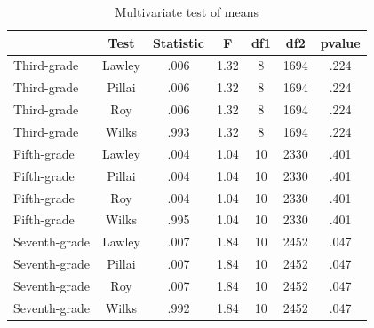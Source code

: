 \documentclass[
	article,			%
	12pt,				%
	oneside,			%
	a4paper,			%
	]{article}
\begin{document}
\begin{table}[htbp]
  \centering
\fontsize{9}{11}\selectfont
 \begin{threeparttable}
  \caption{Multivariate test of means}
\begin{tabular}{lcccccc}
\hline
\hline
     \multicolumn{1}{p{6em}}{}      &      \multicolumn{1}{p{6em}}{Test} &  \multicolumn{1}{p{6em}}{Statistic} &          \multicolumn{1}{p{6em}}{F} &     \multicolumn{1}{p{6em}}{df1} &       \multicolumn{1}{p{6em}}{df2} &   \multicolumn{1}{p{6em}}{pvalue} \\
\hline
Third-grade &     Lawley &       .006 &       1.32 &          8 &       1694 &       .224 \\

Third-grade &     Pillai &       .006 &       1.32 &          8 &       1694 &       .224 \\

Third-grade &        Roy &       .006 &       1.32 &          8 &       1694 &       .224 \\

Third-grade &      Wilks &       .993 &       1.32 &          8 &       1694 &       .224 \\

Fifth-grade &     Lawley &       .004 &       1.04 &         10 &       2330 &       .401 \\

Fifth-grade &     Pillai &       .004 &       1.04 &         10 &       2330 &       .401 \\

Fifth-grade &        Roy &       .004 &       1.04 &         10 &       2330 &       .401 \\

Fifth-grade &      Wilks &       .995 &       1.04 &         10 &       2330 &       .401 \\

Seventh-grade &     Lawley &       .007 &       1.84 &         10 &       2452 &       .047 \\

Seventh-grade &     Pillai &       .007 &       1.84 &         10 &       2452 &       .047 \\

Seventh-grade &        Roy &       .007 &       1.84 &         10 &       2452 &       .047 \\

Seventh-grade &      Wilks &       .992 &       1.84 &         10 &       2452 &       .047 \\


\end{tabular}
\end{threeparttable}
\end{table}
\end{document}
